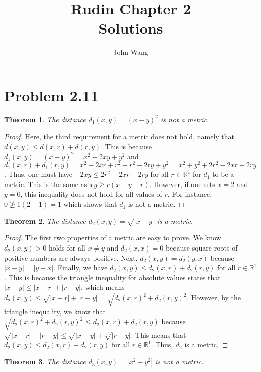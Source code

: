 \documentclass[psamsfonts]{amsart}
\title{Rudin Chapter 2 \\
Solutions}
\author{John Wang}
\newtheorem{thm}{Theorem}[section]
\theoremstyle{definition}
\theoremstyle{remark}
\numberwithin{equation}{section}
\begin{document}
\maketitle

\section{Problem 2.11}

\begin{thm}
The distance $d_1(x,y) = (x-y)^2$ is not a metric.
\end{thm}

\begin{proof}
Here, the third requirement for a metric does not hold, namely that $d(x,y) \leq d(x,r) + d(r,y)$. This is because $d_1(x,y) = (x-y)^2 = x^2 - 2xy + y^2$ and $d_1(x,r) + d_1(r,y) = x^2 - 2xr + r^2 +r^2 - 2ry + y^2 = x^2 + y^2 + 2r^2 - 2xr - 2ry$. Thus, one must have $-2xy \leq 2r^2 - 2xr - 2ry$ for all $r \in \mathbb{R}^1$ for $d_1$ to be a metric. This is the same as $xy \geq r(x+y-r)$. However, if one sets $ x = 2$ and $ y = 0$, this inequality does not hold for all values of $r$. For instance, $ 0 \not\geq 1 ( 2 - 1) = 1 $ which shows that $d_1$ is not a metric. 
\end{proof}

\begin{thm}
The distance $d_2(x,y) = \sqrt{|x-y |}$ is a metric.
\end{thm}

\begin{proof}
The first two properties of a metric are easy to prove. We know $d_2(x,y) > 0$ holds for all $x \neq y$ and $d_2(x,x) = 0$ because square roots of positive numbers are always positive. Next, $d_2(x,y) = d_2(y,x)$ because $|x - y| = |y-x|$. Finally, we have $ d_2(x,y) \leq d_2(x,r) + d_2(r,y)$ for all $r \in \mathbb{R}^1$. This is because the triangle inequality for absolute values states that $|x-y| \leq |x-r| + |r-y|$, which means $d_2(x,y) \leq \sqrt{|x-r| + |r-y|} = \sqrt{ d_2(x,r)^2 + d_2(r,y)^2}$. However, by the triangle inequality, we know that $ \sqrt{ d_2(x,r)^2 + d_2(r,y)^2} \leq d_2(x,r) + d_2(r,y)$ because $\sqrt{|x-r| + |r-y|} \leq \sqrt{|x-y|} + \sqrt{|r-y|}$. This means that $d_2(x,y) \leq d_2(x,r) + d_2(r,y)$ for all $r \in \mathbb{R}^1$.  Thus, $d_2$ is a metric. 
\end{proof}

\begin{thm}
The distance $d_3(x,y) = |x^2 - y^2|$ is not a metric.
\end{thm}
\end{document}
